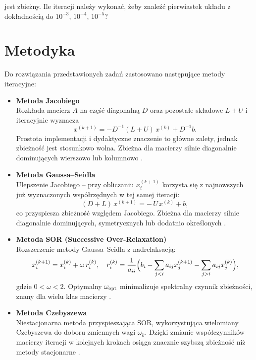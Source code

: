 \documentclass[a4paper,12pt]{article}
\begin{document}
jest zbieżny. Ile iteracji należy wykonać, żeby znaleźć pierwiastek układu z dokładnością do $10^{-3}$, $10^{-4}$, $10^{-5}$?


\section*{Metodyka}

Do rozwiązania przedstawionych zadań zastosowano następujące metody iteracyjne:

\begin{itemize}
  \item \textbf{Metoda Jacobiego} \\
    Rozkłada macierz \(A\) na część diagonalną \(D\) oraz pozostałe składowe \(L+U\) i iteracyjnie wyznacza
    \[
      x^{(k+1)} = -D^{-1}(L+U)\,x^{(k)} + D^{-1}b.
    \]
    Prostota implementacji i dydaktyczne znaczenie to główne zalety, jednak zbieżność jest stosunkowo wolna. 
    Zbieżna dla macierzy silnie diagonalnie dominujących wierszowo lub kolumnowo \cite{Rycerz, wiki:Metoda_Gaussa-Seidla}.

  \item \textbf{Metoda Gaussa–Seidla} \\
    Ulepszenie Jacobiego – przy obliczaniu \(x_i^{(k+1)}\) korzysta się z najnowszych już wyznaczonych współrzędnych w tej samej iteracji:
    \[
      (D+L)\,x^{(k+1)} = -\,U\,x^{(k)} + b,
    \]
    co przyspiesza zbieżność względem Jacobiego. Zbieżna dla macierzy silnie diagonalnie dominujących, symetrycznych lub dodatnio określonych \cite{Rycerz, wiki:Metoda_Gaussa-Seidla}.

  \item \textbf{Metoda SOR (Successive Over‐Relaxation)} \\
    Rozszerzenie metody Gaussa–Seidla z nadrelaksacją:
    \[
      x_i^{(k+1)} = x_i^{(k)} + \omega\,r_i^{(k)},
      \quad
      r_i^{(k)} = \frac{1}{a_{ii}}\Bigl(b_i - \sum_{j<i}a_{ij}x_j^{(k+1)} - \sum_{j>i}a_{ij}x_j^{(k)}\Bigr),
    \]
    gdzie \(0<\omega<2\). Optymalny \(\omega_{\rm opt}\) minimalizuje spektralny czynnik zbieżności, znany dla wielu klas macierzy \cite{Rycerz, wiki:Successive_over-relaxation}.

  \item \textbf{Metoda Czebyszewa} \\
    Niestacjonarna metoda przyspieszająca SOR, wykorzystująca wielomiany Czebyszewa do doboru zmiennych wagi \(\omega_k\). Dzięki zmianie współczynników macierzy iteracji w kolejnych krokach osiąga znacznie szybszą zbieżność niż metody stacjonarne \cite{Rycerz, Funika}.
\end{itemize}
\end{document}
